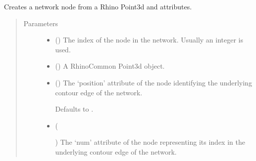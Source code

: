 \documentclass[letterpaper,10pt,english]{sphinxmanual}
\begin{document}
\begin{fulllineitems}
\begin{fulllineitems}
\label{\detokenize{cockatoo:cockatoo.KnitNetworkBase.node_from_point3d}}
Creates a network node from a Rhino Point3d and attributes.
\begin{quote}\begin{description}
\item[{Parameters}] \leavevmode\begin{itemize}
\item {} 
 () \textendash{} The index of the node in the network. Usually an integer is used.

\item {} 
 () \textendash{} A RhinoCommon Point3d object.

\item {} 
 (\sphinxstyleliteralemphasis{\sphinxupquote{, }}) \textendash{} 
The ‘position’ attribute of the node identifying the underlying
contour edge of the network.

Defaults to .


\item {} 
 (%
\begin{footnote}[93]\sphinxAtStartFootnote
{}
%
\end{footnote}\sphinxstyleliteralemphasis{\sphinxupquote{, }}) \textendash{} 
The ‘num’ attribute of the node representing its index in the
underlying contour edge of the network.


\end{itemize}
\end{description}
\end{quote}
\end{fulllineitems}
\end{fulllineitems}
\end{document}
